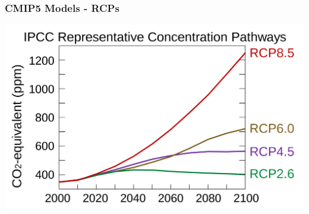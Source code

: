 \begin{frame}
\frametitle{CMIP5 Models - RCPs}
 \begin{center}\includegraphics[width=\textwidth]{rcp}\end{center}
\end{frame}



